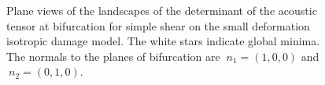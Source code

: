 \documentclass[12pt]{article}
\numberwithin{equation}{section}
\begin{document}
\begin{figure}[!htbp]
   \centering {}   
 \caption{Plane views of the landscapes of the determinant of the
   acoustic tensor at bifurcation for simple shear on the small
   deformation isotropic damage model. The white stars indicate global
   minima.  The normals to the planes of bifurcation are
   $~n_1 = (1,0,0)$ and $~n_2 = (0,1,0)$.}
   \label{fig:iso-shear-detAXplane}
 \end{figure}
\end{document}
